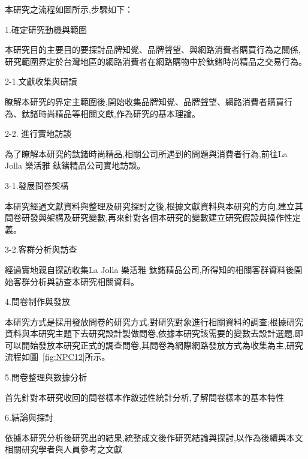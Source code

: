  本研究之流程如圖所示,步驟如下：

1.確定研究動機與範圍

         本研究目的主要目的要探討品牌知覺、品牌聲望、與網路消費者購買行為之關係,研究範圍界定於台灣地區的網路消費者在網路購物中於鈦鍺時尚精品之交易行為。

2-1.文獻收集與研讀

        瞭解本研究的界定主範圍後,開始收集品牌知覺、品牌聲望、網路消費者購買行為、鈦鍺時尚精品等相關文獻,作為研究的基本理論。

2-2. 進行實地訪談

        為了瞭解本研究的鈦鍺時尚精品,相關公司所遇到的問題與消費者行為,前往La Jolla 樂活雅 鈦鍺精品公司實地訪談。

3-1.發展問卷架構

       本研究經過文獻資料與整理及研究探討之後,根據文獻資料與本研究的方向,建立其問卷研發與架構及研究變數,再來針對各個本研究的變數建立研究假設與操作性定義。

3-2.客群分析與訪查

      經過實地親自探訪收集La Jolla 樂活雅 鈦鍺精品公司,所得知的相關客群資料後開始客群分析與訪查本研究相關資料。

4.問卷制作與發放

      本研究方式是採用發放問卷的研究方式,對研究對象進行相關資料的調查;根據研究資料與本研究主題下去研究設計製做問卷,依據本研究該需要的變數去設計選題,即可以開始發放本研究正式的調查問卷,其問卷為網際網路發放方式為收集為主,研究流程如圖~\ref{fig:NPC12}所示。

5.問卷整理與數據分析

      首先針對本研究收回的問卷樣本作敘述性統計分析,了解問卷樣本的基本特性

6.結論與探討

     依據本研究分析後研究出的結果,統整成文後作研究結論與探討,以作為後續與本文相關研究學者與人員參考之文獻

